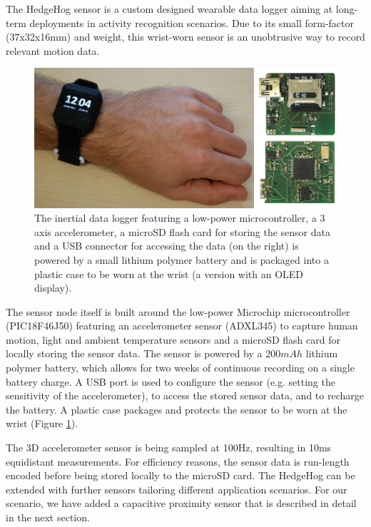 \documentclass[runningheads,a4paper]{llncs}
\begin{document}
The HedgeHog sensor \cite{hedgehog} is a custom designed wearable data logger aiming at long-term deployments in activity recognition scenarios. Due to its small form-factor (37x32x16mm) and weight, this wrist-worn sensor is an unobtrusive way to record relevant motion data.


\begin{figure}[h]
	\centering
	\includegraphics[width=\textwidth]{Images/hardware_sensor_2.jpg}
	\caption{The inertial data logger featuring a low-power microcontroller, a 3 axis accelerometer, a microSD flash card for storing the sensor data and a USB connector for accessing the data (on the right) is powered by a small lithium polymer battery and is packaged into a plastic case to be worn at the wrist (a version with an OLED display).}
	\label{fig:sensornode}
\end{figure}

The sensor node itself is built around the low-power Microchip microcontroller (PIC18F46J50) featuring an accelerometer sensor (ADXL345) to capture human motion, light and ambient temperature sensors and a microSD flash card for locally storing the sensor data. The sensor is powered by a $200mAh$ lithium polymer battery, which allows for two weeks of continuous recording on a single battery charge. A USB port is used to configure the sensor (e.g. setting the sensitivity of the accelerometer), to access the stored sensor data, and to recharge the battery. A plastic case packages and protects the sensor to be worn at the wrist (Figure \ref{fig:sensornode}).

The 3D accelerometer sensor is being sampled at 100Hz, resulting in 10ms equidistant measurements. For efficiency reasons, the sensor data is run-length encoded before being stored locally to the microSD card. 
The HedgeHog can be extended with further sensors tailoring different application scenarios. For our scenario, we have added a capacitive proximity sensor that is described in detail in the next section.
\end{document}
